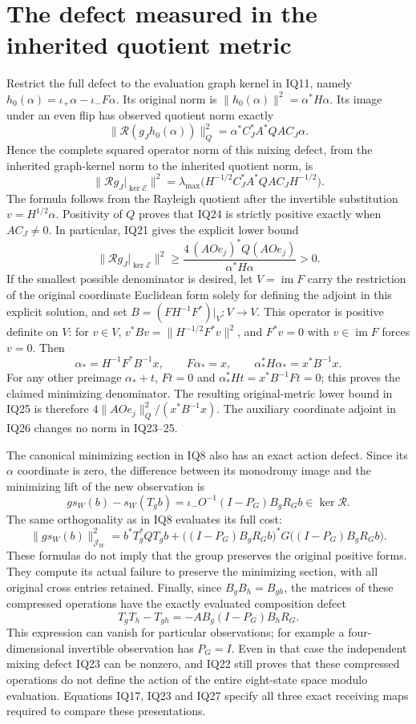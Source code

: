 \documentclass[11pt]{article}
\newcommand{\im}{\operatorname{im}}
\begin{document}
\section{The defect measured in the inherited quotient metric}
Restrict the full defect to the evaluation graph kernel in IQ11, namely
$h_0(\alpha)=\iota_+\alpha-\iota_-F\alpha$.  Its original norm is
$\|h_0(\alpha)\|^2=\alpha^*H\alpha$.  Its image under an even flip
has observed quotient norm exactly
\[
 \|\mathcal R(g_Jh_0(\alpha))\|_Q^2
   =\alpha^*C_J^*A^*QA C_J\alpha.                  \tag{IQ23}
\]
Hence the complete squared operator norm of this mixing defect, from
the inherited graph-kernel norm to the inherited quotient norm, is
\[
 \|\mathcal Rg_J|_{\ker\mathcal E}\|^2
 =\lambda_{\max}
   \bigl(H^{-1/2}C_J^*A^*QA C_JH^{-1/2}\bigr).       \tag{IQ24}
\]
The formula follows from the Rayleigh quotient after the invertible
substitution $v=H^{1/2}\alpha$.  Positivity of $Q$ proves that IQ24
is strictly positive exactly when $AC_J\ne0$.  In particular, IQ21
gives the explicit lower bound
\[
 \|\mathcal Rg_J|_{\ker\mathcal E}\|^2
 \ge \frac{4\,(AOe_j)^*Q(AOe_j)}{\alpha^*H\alpha}>0. \tag{IQ25}
\]
If the smallest possible denominator is desired, let
$V=\im F$ carry the restriction of the original coordinate Euclidean
form solely for defining the adjoint in this explicit solution, and set
$B=(FH^{-1}F^*)|_V:V\to V$.  This operator is positive definite on
$V$: for $v\in V$, $v^*Bv=\|H^{-1/2}F^*v\|^2$, and
$F^*v=0$ with $v\in\im F$ forces $v=0$.  Then
\[
 \alpha_*=H^{-1}F^*B^{-1}x,\qquad
 F\alpha_*=x,\qquad
 \alpha_*^*H\alpha_*=x^*B^{-1}x.                   \tag{IQ26}
\]
For any other preimage $\alpha_*+t$, $Ft=0$ and
$\alpha_*^*Ht=x^*B^{-1}Ft=0$; this proves the claimed minimizing
denominator.  The resulting original-metric lower bound in IQ25 is
therefore $4\|AOe_j\|_Q^2/(x^*B^{-1}x)$.  The auxiliary coordinate
adjoint in IQ26 changes no norm in IQ23--25.

The canonical minimizing section in IQ8 also has an exact action defect.
Since its $\alpha$ coordinate is zero, the difference between its
monodromy image and the minimizing lift of the new observation is
\[
 g s_W(b)-s_W(T_gb)
 =\iota_-O^{-1}(I-P_G)B_gR_Gb\in\ker\mathcal R.     \tag{IQ27}
\]
The same orthogonality as in IQ8 evaluates its full cost:
\[
 \|g s_W(b)\|_{\mathcal J_W}^2
 =b^*T_g^*QT_gb+
  \bigl((I-P_G)B_gR_Gb\bigr)^*G
       \bigl((I-P_G)B_gR_Gb\bigr).                 \tag{IQ28}
\]
These formulas do not imply that the group preserves the original
positive forms.  They compute its actual failure to preserve the
minimizing section, with all original cross entries retained.
Finally, since $B_gB_h=B_{gh}$, the matrices of these compressed
operations have the exactly evaluated composition defect
\[
 T_gT_h-T_{gh}
   =-AB_g(I-P_G)B_hR_G.                            \tag{IQ29}
\]
This expression can vanish for particular observations; for example a
four-dimensional invertible observation has $P_G=I$.  Even in that
case the independent mixing defect IQ23 can be nonzero, and IQ22
still proves that these compressed operations do not define the
action of the entire eight-state space modulo evaluation.  Equations
IQ17, IQ23 and IQ27 specify all three exact receiving maps required
to compare these presentations.
\end{document}
